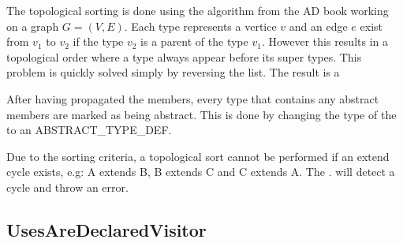 The topological sorting is done using the algorithm from the AD book working on a graph $G = (V, E)$. Each type represents a vertice $v$ and an edge $e$ exist from $v_1$ to $v_2$ if the type $v_2$ is a parent of the type $v_1$. However this results in a topological order where a type always appear before its super types. This problem is quickly solved simply by reversing the list. The result is a  

 
After having propagated the members, every type that contains any abstract members are marked as being abstract. This is done by changing the type of the  to an ABSTRACT\_TYPE\_DEF.

Due to the sorting criteria, a topological sort cannot be performed if an extend cycle exists, e.g: A extends B, B extends C and C extends A. The . will detect a cycle and throw an error.

\subsection{UsesAreDeclaredVisitor}
\label{sec:usesaredeclaredvisitor}

